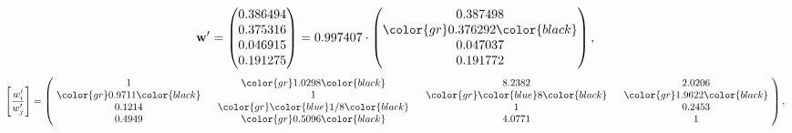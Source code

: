 \begin{example}
\begin{equation*}
\mathbf{w}^{\prime} =
\begin{pmatrix}
0.386494\\
0.375316\\
0.046915\\
0.191275
\end{pmatrix} =
0.997407\cdot
\begin{pmatrix}
0.387498\\
\color{gr} 0.376292\color{black} \\
0.047037\\
0.191772
\end{pmatrix},
\end{equation*}
\begin{equation*}
\left[ \frac{{w}^{\prime}_i}{{w}^{\prime}_j} \right] =
\begin{pmatrix}
$\,\,$ 1 $\,\,$ & $\,\,$\color{gr} 1.0298\color{black} $\,\,$ & $\,\,$8.2382$\,\,$ & $\,\,$2.0206$\,\,$ \\
$\,\,$\color{gr} 0.9711\color{black} $\,\,$ & $\,\,$ 1 $\,\,$ & $\,\,$\color{gr} \color{blue} 8\color{black} $\,\,$ & $\,\,$\color{gr} 1.9622\color{black}   $\,\,$ \\
$\,\,$0.1214$\,\,$ & $\,\,$\color{gr} \color{blue}  1/8\color{black} $\,\,$ & $\,\,$ 1 $\,\,$ & $\,\,$0.2453 $\,\,$ \\
$\,\,$0.4949$\,\,$ & $\,\,$\color{gr} 0.5096\color{black} $\,\,$ & $\,\,$4.0771$\,\,$ & $\,\,$ 1  $\,\,$ \\
\end{pmatrix},
\end{equation*}
\end{example}
\newpage
